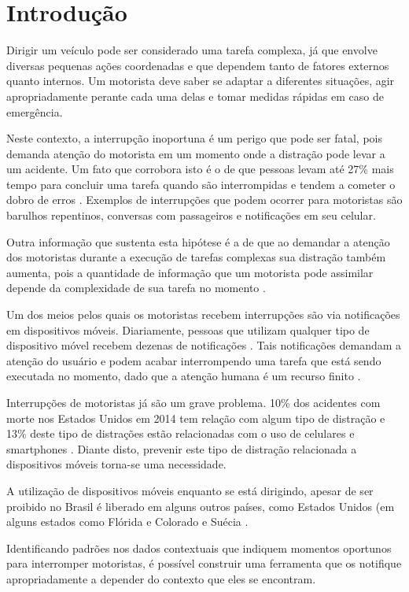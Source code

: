 \chapter{Introdução}
\label{introducao}

Dirigir um veículo pode ser considerado uma tarefa complexa, já que envolve diversas pequenas ações coordenadas e
que dependem tanto de fatores externos quanto internos. Um motorista deve saber se adaptar a diferentes situações,
agir apropriadamente perante cada uma delas e tomar medidas rápidas em caso de emergência.

Neste contexto, a interrupção inoportuna é um perigo que pode ser fatal, pois demanda atenção do motorista em um momento
onde a distração pode levar a um acidente. Um fato que corrobora isto é o de que pessoas levam até 27\% mais tempo para
concluir uma tarefa quando são interrompidas e tendem a cometer o dobro de erros \cite{bailey2006need}. Exemplos de
interrupções que podem ocorrer para motoristas são barulhos repentinos, conversas com passageiros e notificações em
seu celular.

Outra informação que sustenta esta hipótese é a de que ao demandar a atenção dos motoristas durante a execução de
tarefas complexas sua distração também aumenta, pois a quantidade de informação que um motorista pode assimilar
depende da complexidade de sua tarefa no momento \cite{schneegass2013data}.

Um dos meios pelos quais os motoristas recebem interrupções são via notificações em dispositivos móveis.
Diariamente, pessoas que utilizam qualquer tipo de dispositivo móvel recebem dezenas de notificações
\cite{pielot2014situ}. Tais notificações demandam a atenção do usuário e podem acabar interrompendo uma tarefa que
está sendo executada no momento, dado que a atenção humana é um recurso finito \cite{simon1971designing}.

Interrupções de motoristas já são um grave problema. 10\% dos acidentes com morte nos Estados Unidos em 2014 tem relação
com algum tipo de distração e 13\% deste tipo de distrações estão relacionadas com o uso de celulares e smartphones
\cite{distracted2014}. Diante disto, prevenir este tipo de distração relacionada a dispositivos móveis torna-se uma necessidade.

A utilização de dispositivos móveis enquanto se está dirigindo, apesar de ser proibido no Brasil é liberado em alguns
outros países, como Estados Unidos (em alguns estados como Flórida e Colorado \cite{cellphoneuse} \cite{distracteddriving} e Suécia \cite{swedendrive}.

Identificando padrões nos dados contextuais que indiquem momentos oportunos para interromper motoristas, é possível
construir uma ferramenta que os notifique apropriadamente a depender do contexto que eles se encontram.
